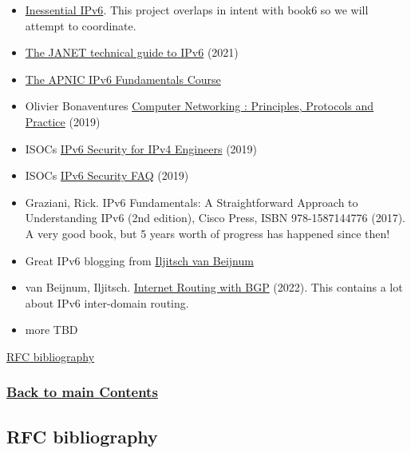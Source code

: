 \documentclass[
]{article}
\begin{document}
\begin{itemize}
\item
  \href{https://docs.google.com/document/d/1WohukYWdlFcEaSm-SQtX5Zgrkr-FZiZnfhlvoFi5Bl0/edit}{Inessential
  IPv6}. This project overlaps in intent with book6 so we will attempt
  to coordinate.
\item
  \href{https://repository.jisc.ac.uk/8349/1/janet-ipv6-technical-guide.pdf}{The
  JANET technical guide to IPv6} (2021)
\item
  \href{https://academy.apnic.net/en/course/ipv6-fundamentals}{The APNIC
  IPv6 Fundamentals Course}
\item
  Olivier Bonaventure\textquotesingle s
  \href{https://beta.computer-networking.info/syllabus/default/protocols/ipv6.html\#ip-version-6}{Computer
  Networking : Principles, Protocols and Practice} (2019)
\item
  ISOC\textquotesingle s
  \href{https://www.internetsociety.org/resources/deploy360/ipv6/security/ipv4-engineers/}{IPv6
  Security for IPv4 Engineers} (2019)
\item
  ISOC\textquotesingle s
  \href{https://www.internetsociety.org/deploy360/ipv6/security/faq/}{IPv6
  Security FAQ} (2019)
\item
  Graziani, Rick. IPv6 Fundamentals: A Straightforward Approach to
  Understanding IPv6 (2nd edition), Cisco Press, ISBN 978-1587144776
  (2017). A very good book, but 5 years\textquotesingle{} worth of
  progress has happened since then!
\item
  Great IPv6 blogging from \href{https://ipv6.iljitsch.com/}{Iljitsch
  van Beijnum}
\item
  van Beijnum, Iljitsch.
  \href{https://www.iljitsch.com/2022/11-18-new-e-book-internet-routing-with-bgp.html}{Internet
  Routing with BGP} (2022). This contains a lot about IPv6 inter-domain
  routing.
\item
  more TBD
\end{itemize}

\hyperref[rfc-bibliography]{RFC bibliography}

\subsubsection{\texorpdfstring{\hyperref[list-of-contents]{Back to main
Contents}}{Back to main Contents}}\label{back-to-main-contents-10}

\pagebreak

\subsection{RFC bibliography}\label{rfc-bibliography}
\end{document}
